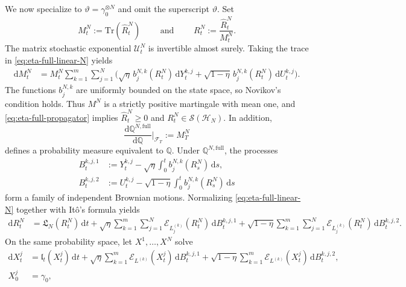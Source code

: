 \documentclass[10pt,a4paper,reqno]{amsart}
\numberwithin{equation}{section}
\theoremstyle{plain}
\theoremstyle{definition}
\theoremstyle{remark}
\renewcommand{\d}{\mathrm d}
\newcommand{\Tr}{\mathrm{Tr}}
\newcommand{\Q}{\mathbb Q}
\newcommand{\cS}{\mathcal S}
\newcommand{\cF}{\mathcal F}
\newcommand{\cE}{\mathcal E}
\newcommand{\HH}{\mathcal H}
\newcommand{\1}{\mathbf 1}
\begin{document}
We now specialize to
\(
  \vartheta=\gamma_0^{\otimes N}
\)
and omit the superscript $\vartheta$.  Set
\begin{equation}
  M_t^N:=\Tr(\widehat R_t^N)
  \qquad\mbox{ and } \qquad 
  R_t^N:=\frac{\widehat R_t^N}{M_t^N}.
  \label{eq:eta-MR-def}
\end{equation}
The matrix stochastic exponential $\mathscr U_t^N$ is invertible almost surely.  Taking the trace in
\eqref{eq:eta-full-linear-N} yields
\[
\begin{aligned}
  \d M_t^N
  &=
  M_t^N
  \sum_{k=1}^m\sum_{j=1}^N
  \bigg(
    \sqrt{\eta}\,b_j^{N,k}(R_t^N)\,\d Y_t^{k,j}+
    \sqrt{1-\eta}\,b_j^{N,k}(R_t^N)\,\d U_t^{k,j}
  \bigg).
\end{aligned}
\]
The functions $b_j^{N,k}$ are uniformly bounded on the state space, so
Novikov's condition holds.  Thus $M^N$ is a strictly positive martingale
with mean one, and  \eqref{eq:eta-full-propagator} implies $\widehat R_t^N\ge0$ and $R_t^N\in\cS(\HH_N)$.   In addition,
\begin{equation}
  \frac{\d\Q^{N,\mathrm{full}}}{\d\Q}
  \bigg|_{\cF_T}
  :=M_T^N
  \label{eq:eta-full-measure}
\end{equation}
defines a probability measure equivalent to $\Q$.  Under
$\Q^{N,\mathrm{full}}$, the processes
\begin{align}
  B_t^{k,j,1}
  &:={}
  Y_t^{k,j}
  -\sqrt{\eta}
  \int_0^t b_j^{N,k}(R_s^N)\,\d s,
  \label{eq:eta-B1-full}
  \\
  B_t^{k,j,2}
  &:={}
  U_t^{k,j}
  -\sqrt{1-\eta}
  \int_0^t b_j^{N,k}(R_s^N)\,\d s
  \label{eq:eta-B2-full}
\end{align}
form a family of  independent Brownian motions.  Normalizing
\eqref{eq:eta-full-linear-N} together with Itô's formula yields
\begin{equation}
\begin{aligned}
  \d R_t^N
  &=
  \mathfrak L_N(R_t^N)\,\d t
 +
  \sqrt{\eta}
  \sum_{k=1}^m\sum_{j=1}^N
  \cE_{L_j^{(k)}}(R_t^N)\,\d B_t^{k,j,1}+
  \sqrt{1-\eta}
  \sum_{k=1}^m\sum_{j=1}^N
  \cE_{L_j^{(k)}}(R_t^N)\,\d B_t^{k,j,2}.
\end{aligned}
  \label{eq:eta-full-nonlinear-N}
\end{equation}
On the same probability space,  let \(X^1,\ldots,X^N\) solve
\begin{equation}
\begin{aligned}
  \d X_t^j
  &=
  \mathfrak l_t(X_t^j)\,\d t
  +
  \sqrt{\eta}
  \sum_{k=1}^m
  \cE_{L^{(k)}}(X_t^j)\,\d B_t^{k,j,1}
  +
  \sqrt{1-\eta}
  \sum_{k=1}^m
  \cE_{L^{(k)}}(X_t^j)\,\d B_t^{k,j,2},
  \\
  X_0^j&=\gamma_0,
\end{aligned}
  \label{eq:eta-full-MF}
\end{equation}
\end{document}
